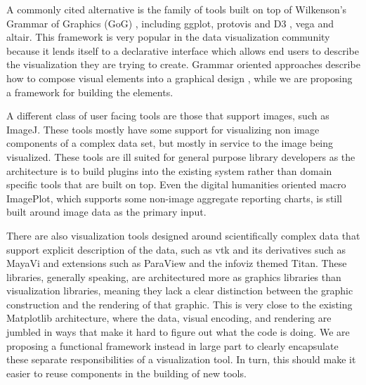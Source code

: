 \documentclass[../main.tex]{subfiles}
\begin{document}
A commonly cited alternative is the family of tools built on top of Wilkenson's Grammar of Graphics (GoG) \cite{wilkinsonGrammarGraphics2005}, including ggplot\cite{wickhamGgplot2ElegantGraphics2016a}, protovis\cite{bostockProtoviz2009} and D3 \cite{bostockDataDrivenDocuments2011}, vega\cite{satyanarayanDeclarativeInteractionDesign2014} and altair\cite{vanderplasAltairInteractiveStatistical2018}. This framework is very popular in the data visualization community because it lends itself to a declarative interface \cite{heerDeclarative2010} which allows end users to describe the visualization they are trying to create.  Grammar oriented approaches describe how to compose visual elements into a graphical design \cite{wongsuphasawatNavigatingWideWorld2021}, while we are proposing a framework for building the elements.  

A different class of user facing tools are those that support images, such as ImageJ\cite{schneiderNIHImageImageJ2012}. These tools mostly have some support for visualizing non image components of a complex data set, but mostly in service to the image being visualized. These tools are ill suited for general purpose library developers as the architecture is to build plugins into the existing system \cite{WritingPlugins} rather than domain specific tools that are built on top. Even the digital humanities oriented macro ImagePlot\cite{studiesCulturevisImageplot2021}, which supports some non-image aggregate reporting charts, is still built around image data as the primary input. 

There are also visualization tools designed around scientifically complex data that support explicit description of the data, such as vtk\cite{hanwellVisualizationToolkitVTK2015,geveci2012vtk} and its derivatives such as MayaVi\cite{ramachandranMayaVi2011} and extensions such as ParaView\cite{ahrens2005paraview} and the infoviz themed Titan\cite{brianwylieUnifiedToolkitInformation2009}. These libraries, generally speaking, are architectured more as graphics libraries than visualization libraries, meaning they lack a clear distinction between the graphic construction and the rendering of that graphic. This is very close to the existing Matplotlib architecture, where the data, visual encoding, and rendering are jumbled in ways that make it hard to figure out what the code is doing. We are proposing a functional framework instead in large part to clearly encapsulate these separate responsibilities of a visualization tool. In turn, this should make it easier to reuse components in the building of new tools. 
\end{document}
